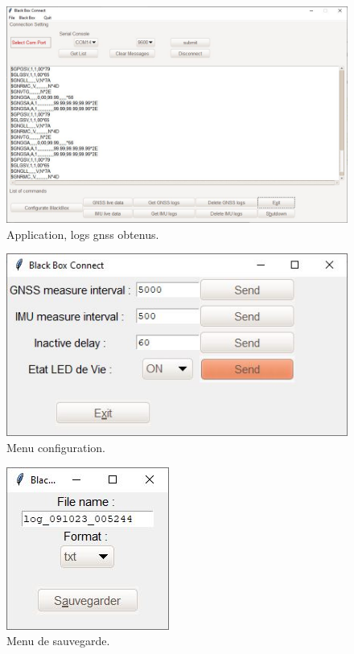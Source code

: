 \begin{figure}[H]
	\centering
	\includegraphics[width=.75\linewidth]{../figures/application/screen_logGnss}
	\caption{Application, logs \gls{gnss} obtenus.}
	\label{fig:screenloggnss}
\end{figure}

\begin{figure}[h]
	\centering
	\includegraphics[width=.5\linewidth]{../figures/application/Config_window}
	\caption{Menu configuration.}
	\label{fig:configwindow}
\end{figure}

\begin{figure}[H]
	\centering
	\includegraphics[width=.2\linewidth]{../figures/application/scree_save}
	\caption{Menu de sauvegarde.}
	\label{fig:screesave}
\end{figure}






